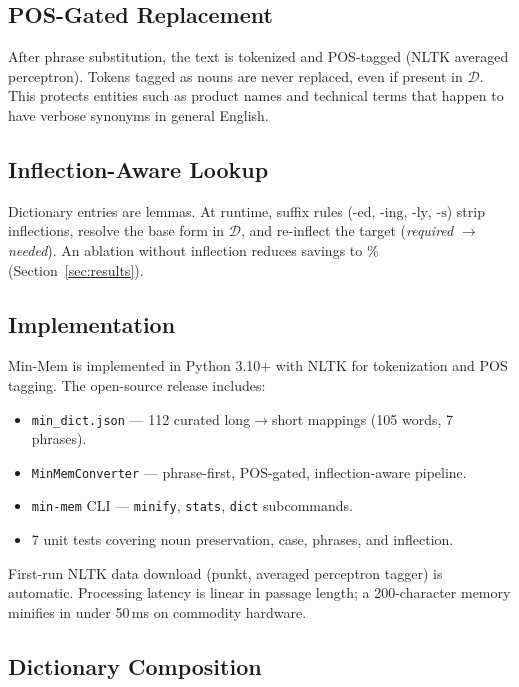\documentclass[10pt,twocolumn]{article}
\begin{document}
\subsection{POS-Gated Replacement}

After phrase substitution, the text is tokenized and POS-tagged (NLTK averaged perceptron). Tokens tagged as nouns are never replaced, even if present in $\mathcal{D}$. This protects entities such as product names and technical terms that happen to have verbose synonyms in general English.

\subsection{Inflection-Aware Lookup}

Dictionary entries are lemmas. At runtime, suffix rules ($\text{-ed}$, $\text{-ing}$, $\text{-ly}$, $\text{-s}$) strip inflections, resolve the base form in $\mathcal{D}$, and re-inflect the target (\emph{required} $\rightarrow$ \emph{needed}). An ablation without inflection reduces savings to \NoInflCharSavings\% (Section~\ref{sec:results}).

\subsection{Implementation}

Min-Mem is implemented in Python 3.10+ with NLTK for tokenization and POS tagging. The open-source release includes:
\begin{itemize}
    \item \texttt{min\_dict.json} --- 112 curated long$\rightarrow$short mappings (105 words, 7 phrases).
    \item \texttt{MinMemConverter} --- phrase-first, POS-gated, inflection-aware pipeline.
    \item \texttt{min-mem} CLI --- \texttt{minify}, \texttt{stats}, \texttt{dict} subcommands.
    \item 7 unit tests covering noun preservation, case, phrases, and inflection.
\end{itemize}

First-run NLTK data download (punkt, averaged perceptron tagger) is automatic. Processing latency is linear in passage length; a 200-character memory minifies in under 50\,ms on commodity hardware.

\subsection{Dictionary Composition}
\end{document}
